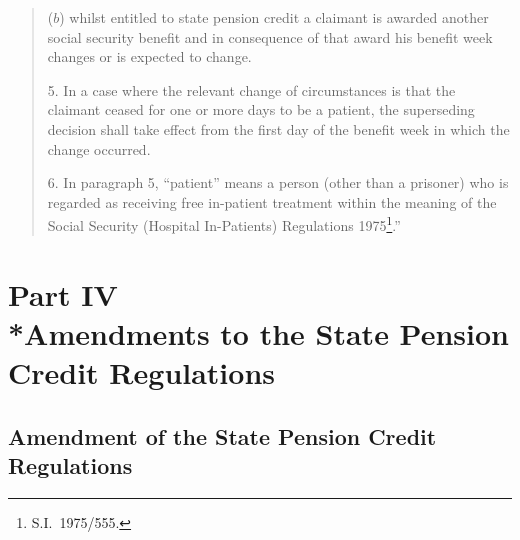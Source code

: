 \documentclass[12pt,a4paper]{article}
\begin{document}
\begin{quotation}
\begin{enumerate}
($b$) whilst entitled to state pension credit a claimant is awarded another social security benefit and in consequence of that award his benefit week changes or is expected to change.
\end{enumerate}

\medskip

5.  In a case where the relevant change of circumstances is that the claimant ceased for one or more days to be a patient, the superseding decision shall take effect from the first day of the benefit week in which the change occurred.

\medskip

6.  In paragraph 5, “patient” means a person (other than a prisoner) who is regarded as receiving free in-patient treatment within the meaning of the Social Security (Hospital In-Patients) Regulations 1975\footnote{S.I.\ 1975/555.}.”
\end{quotation}

\section[Part IV --- Amendments to the State Pension Credit Regulations]{Part IV\\*Amendments to the State Pension Credit Regulations}

\renewcommand\parthead{--- Part IV}

\subsection[23. Amendment of the State Pension Credit Regulations]{Amendment of the State Pension Credit Regulations}
\end{document}
